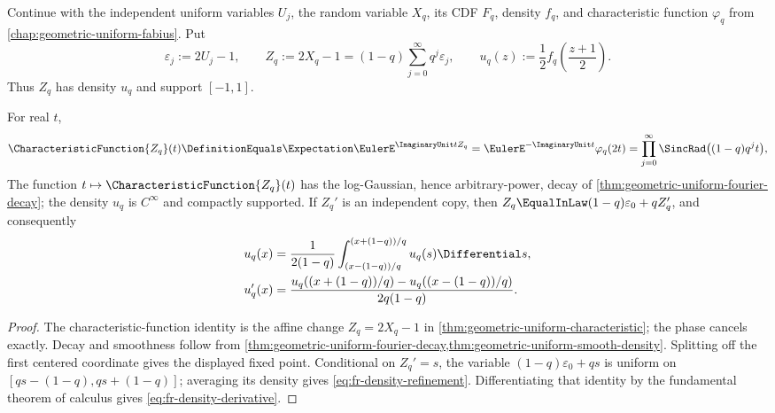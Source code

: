 Continue with the independent uniform variables \(U_j\), the random variable
\(X_q\), its CDF \(F_q\), density \(f_q\), and characteristic function
\(\varphi_q\) from \cref{chap:geometric-uniform-fabius}.  Put
\begin{equation}\label{eq:fr-Z}
 \varepsilon_j:=2U_j-1,
 \qquad
 Z_q:=2X_q-1=(1-q)\sum_{j=0}^{\infty}q^j\varepsilon_j,
 \qquad
 u_q(z):=\frac12 f_q\!\left(\frac{z+1}{2}\right).
\end{equation}
Thus \(Z_q\) has density \(u_q\) and support \([-1,1]\).

\begin{corollary}
\label{thm:fr-geometric-density}
For real \(t\),
\begin{equation}
 \CharacteristicFunction{Z_q}(t)\DefinitionEquals
 \Expectation\EulerE^{\ImaginaryUnit tZ_q}
 =\EulerE^{-\ImaginaryUnit t}\varphi_q(2t)
 =\prod_{j=0}^{\infty}\SincRad\bigl((1-q)q^jt\bigr),
 \label{eq:fr-sinc-product}
\end{equation}
The function \(t\mapsto\CharacteristicFunction{Z_q}(t)\) has the log-Gaussian,
hence arbitrary-power, decay of
\cref{thm:geometric-uniform-fourier-decay}; the density \(u_q\) is
\(C^\infty\) and compactly supported.  If \(Z_q'\) is an independent copy,
then \(Z_q\EqualInLaw(1-q)\varepsilon_0+qZ_q'\), and consequently
\begin{align}
 u_q(x)
 &=\frac1{2(1-q)}
   \int_{(x-(1-q))/q}^{(x+(1-q))/q}u_q(s)\Differential s,
 \label{eq:fr-density-refinement}\\
 u_q'(x)
 &=\frac{u_q((x+(1-q))/q)-u_q((x-(1-q))/q)}
 {2q(1-q)}.\label{eq:fr-density-derivative}
\end{align}
\end{corollary}

\begin{proof}
The characteristic-function identity is the affine change
\(Z_q=2X_q-1\) in \cref{thm:geometric-uniform-characteristic}; the phase
cancels exactly.  Decay and smoothness follow from
\cref{thm:geometric-uniform-fourier-decay,thm:geometric-uniform-smooth-density}.
Splitting off the first centered
coordinate gives the displayed fixed point.  Conditional on \(Z_q'=s\), the
variable \((1-q)\varepsilon_0+qs\) is uniform on
\([qs-(1-q),qs+(1-q)]\); averaging its density gives
\cref{eq:fr-density-refinement}.  Differentiating that identity by the
fundamental theorem of calculus gives \cref{eq:fr-density-derivative}.
\end{proof}

